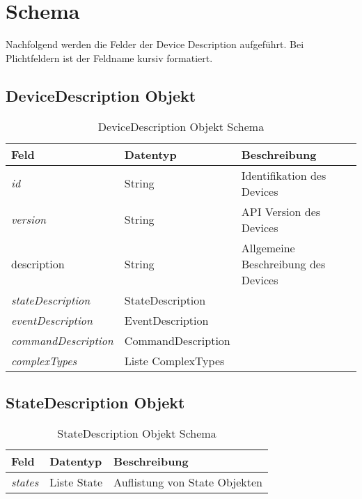 \section{Schema}

Nachfolgend werden die Felder der Device Description aufgeführt. Bei Plichtfeldern ist der Feldname kursiv formatiert.

\subsection{DeviceDescription Objekt}

\begin{table}[H]
\begin{tabularx}{\textwidth}{|l|l|X|}

 \hline
 {\bf Feld } & {\bf Datentyp } & {\bf Beschreibung } \\  \hline

 \textit{id}  &   String   & Identifikation des Devices   \\ \hline

 \textit{version} & String & API Version des Devices \\ \hline

 description & String & Allgemeine Beschreibung des Devices \\ \hline 
 
 \textit{stateDescription}  &   StateDescription    &     \\ \hline
 
 \textit{eventDescription}  &   EventDescription    &     \\ \hline
  
 \textit{commandDescription}  &   CommandDescription    &     \\ \hline
 
 \textit{complexTypes}  &   Liste ComplexTypes    &     \\ \hline
 
\end{tabularx}
\caption{DeviceDescription Objekt Schema}
\end{table}

\subsection{StateDescription Objekt}
\begin{table}[H]
\begin{tabularx}{\textwidth}{|l|l|X|}

 \hline
 {\bf Feld } & {\bf Datentyp } & {\bf Beschreibung } \\  \hline

 \textit{states}  &   Liste State   & Auflistung von State Objekten   \\ \hline

\end{tabularx}
\caption{StateDescription Objekt Schema}
\end{table}

